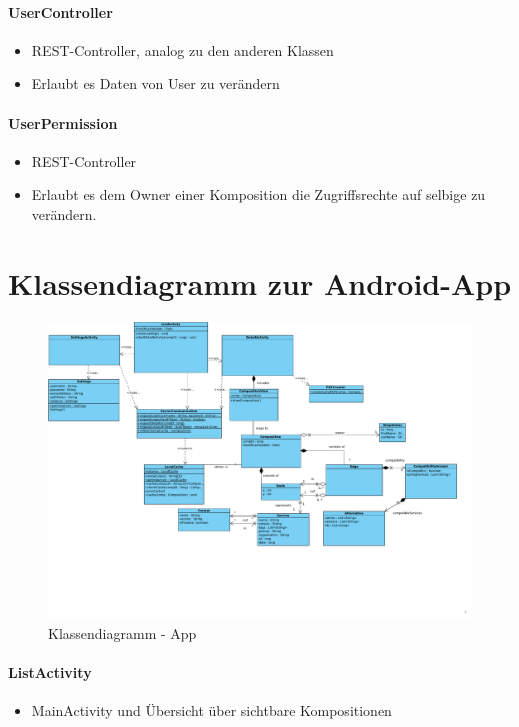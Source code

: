 \paragraph{UserController}
\begin{itemize}
	\item REST-Controller, analog zu den anderen Klassen
	\item Erlaubt es Daten von User zu verändern
\end{itemize}
\paragraph{UserPermission}
\begin{itemize}
	\item REST-Controller
	\item Erlaubt es dem Owner einer Komposition die Zugriffsrechte auf selbige zu verändern.
\end{itemize}

\newpage
\section*{Klassendiagramm zur Android-App}

\begin{figure}[!h]
	\centering
	\includegraphics[width=\textwidth]{img/Diagramme/Klassen/App}
	\caption{Klassendiagramm - App}
	\label{fig:klassendiagramm-app}
\end{figure}

\paragraph{ListActivity}
\begin{itemize}
	\item MainActivity und Übersicht über sichtbare Kompositionen 
\end{itemize}
